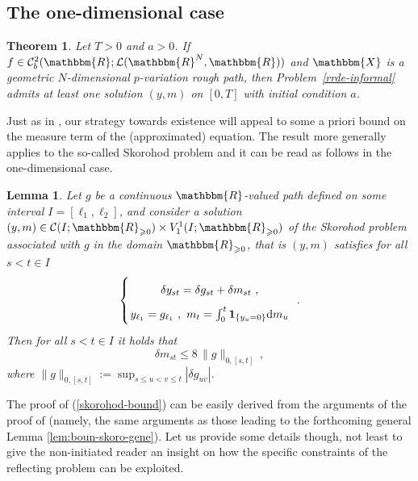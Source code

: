 \documentclass[11pt,reqno,oneside]{amsart}
\numberwithin{equation}{section}
\newcommand{\assign}{:=}
\newcommand{\mathd}{\mathrm{d}}
\newtheorem{lemma}{Lemma}
\newtheorem{theorem}{Theorem}
\begin{document}
\subsection{The one-dimensional case}

\begin{theorem}\label{theo:exi}
Let $T>0$ and $a>0$. If $f\in \mathcal{C}_b^2(\mathbbm{R};\mathcal{L}(\mathbbm{R}^N,\mathbbm{R}))$ and $\mathbbm{X}$ is a geometric $N$-dimensional $p$-variation rough path, then Problem~\eqref{rrde-informal} admits at least one solution $(y,m)$ on $[0,T]$ with initial condition $a$.
\end{theorem}

Just as in \cite{aida_reflected_2015,aida-2016}, our strategy towards existence will appeal to some a priori bound on the measure term of the (approximated) equation. The result more generally applies to the so-called Skorohod problem and it can be read as follows in the one-dimensional case.   

\begin{lemma}\label{lem:skorohod-bound}
Let $g$ be a continuous $\mathbbm{R}$-valued path defined on some interval $I=[\ell_1,\ell_2]$, and consider a solution $(y,m)\in \mathcal{C}(I;\mathbbm{R}_{\geqslant 0}) \times V^1_1(I;\mathbbm{R}_{\geqslant 0})$ of the Skorohod problem associated with $g$ in the domain $\mathbbm{R}_{\geqslant 0}$, that is $(y,m)$ satisfies for all $s<t\in I$
$$\arraycolsep=1pt\def\arraystretch{1.8}
\left\lbrace\begin{array}{c}
\delta y_{st}=\delta g_{st}+\delta m_{st} \ , \\
y_{\ell_1}=g_{\ell_1} \ , \ m_t=\int_0^t \mathbf{1}_{\{y_u=0\}} \mathd m_u
\end{array} \right. \ .
$$
Then for all $s<t\in I$ it holds that 
\begin{equation}\label{skorohod-bound}
\delta m_{st}\leqslant 8\,  \lVert g \rVert_{0,[s,t]} \ ,
\end{equation}
where $\lVert g \rVert_{0,[s,t]}\assign \sup_{s\leqslant u<v\leqslant t} |\delta g_{uv}|$.
\end{lemma}

{The proof of (\ref{skorohod-bound}) can be easily derived from the arguments of the proof of \cite[Lemma 2.3]{aida-sasaki} (namely, the same arguments as those leading to the forthcoming general Lemma \ref{lem:boun-skoro-gene}). Let us provide some details though, not least to give the non-initiated reader an insight on how the specific constraints of the reflecting problem can be exploited.}
\end{document}
